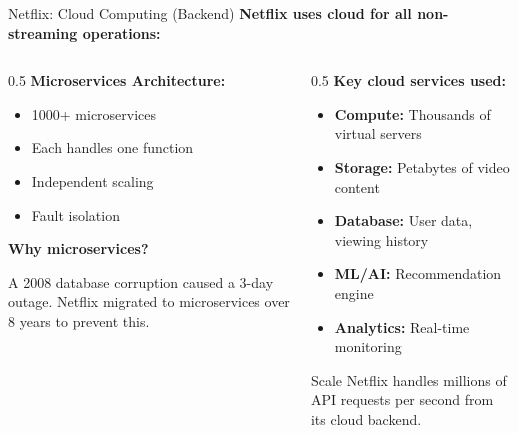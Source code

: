 \documentclass[aspectratio=169,12pt]{beamer}
\begin{document}
\begin{frame}{Netflix: Cloud Computing (Backend)}
    \textbf{Netflix uses cloud for all non-streaming operations:}
    
    \vspace{0.3cm}
    \begin{columns}
        \begin{column}{0.5\textwidth}
            \textbf{Microservices Architecture:}
            \begin{itemize}
                \item 1000+ microservices
                \item Each handles one function
                \item Independent scaling
                \item Fault isolation
            \end{itemize}
            
            \vspace{0.3cm}
            \textbf{Why microservices?}
            
            A 2008 database corruption caused a 3-day outage. Netflix migrated to microservices over 8 years to prevent this.
        \end{column}
        \begin{column}{0.5\textwidth}
            \textbf{Key cloud services used:}
            \begin{itemize}
                \item \textbf{Compute:} Thousands of virtual servers
                \item \textbf{Storage:} Petabytes of video content
                \item \textbf{Database:} User data, viewing history
                \item \textbf{ML/AI:} Recommendation engine
                \item \textbf{Analytics:} Real-time monitoring
            \end{itemize}
            
            \vspace{0.3cm}
            \begin{block}{Scale}
                Netflix handles millions of API requests per second from its cloud backend.
            \end{block}
        \end{column}
    \end{columns}
\end{frame}
\end{document}
